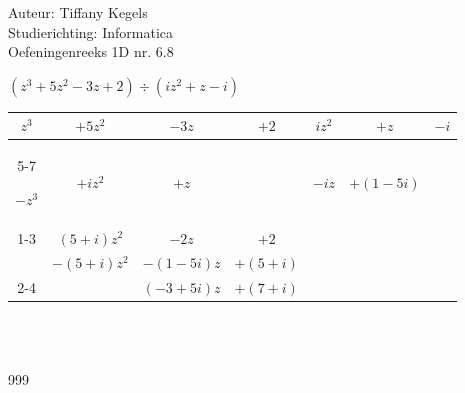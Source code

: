 \documentclass[a4paper]{article}
\begin{document}
  
\noindent \large Auteur: Tiffany Kegels \\
\noindent \large Studierichting: Informatica\\
\noindent \large Oefeningenreeks 1D nr. 6.8\\

\medskip

\normalsize

$(z^3 + 5z^2 -3z +2) \div (iz^2 +z -i)$\\

\begin{tabular}{cccc|ccc}
 $z^3$ & $+5z^2$     & $-3z$      & $+2$ & $iz^2$ & $+z$ & $-i$\\ \cline{5-7}

$-z^3$ & $+iz^2$     & $+z$       &      &  $-iz$ & $+(1-5i)$\\ \cline{1-3}

       & $(5+i)z^2$  & $-2z$      & $+2$\\ 

       & $-(5+i)z^2$ & $-(1-5i)z$ & $+(5+i)$\\ \cline{2-4}

       &             & $(-3+5i)z$ & $+(7+i)$\\

\end{tabular}\\\\


\begin{thebibliography}{999}

\end{thebibliography}
\end{document}
